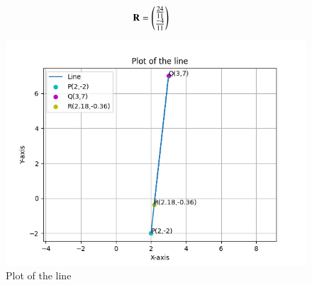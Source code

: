 \documentclass[journal]{IEEEtran}
\begin{document}
\begin{align}
\mathbf{R} &= \begin{pmatrix}\frac{24}{11} \\ \frac{-4}{11}\end{pmatrix} 
\end{align}

\begin{figure}[h!]
   \centering
   \includegraphics[width=0.7\linewidth]{figs/fig.png}
   \caption{Plot of the line}
   \label{stemplot}
\end{figure}
\end{document}
